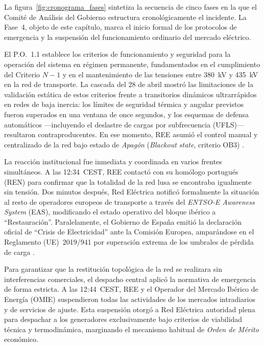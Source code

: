 La figura~\ref{fig:cronograma_fases} sintetiza la secuencia de cinco fases
en la que el Comité de Análisis del Gobierno estructura cronológicamente
el incidente. La Fase~4, objeto de este capítulo, marca el inicio formal
de los protocolos de emergencia y la suspensión del funcionamiento ordinario
del mercado eléctrico.

El P.O.~1.1 establece los criterios de funcionamiento y seguridad para la
operación del sistema en régimen permanente, fundamentados en el cumplimiento
del Criterio $N-1$ y en el mantenimiento de las tensiones entre 380~kV y
435~kV en la red de transporte. La cascada del 28 de abril mostró las
limitaciones de la validación estática de estos criterios frente a
transitorios dinámicos ultrarrápidos en redes de baja inercia: los límites
de seguridad térmica y angular previstos fueron superados en una ventana
de once segundos, y los esquemas de defensa automáticos ---incluyendo el
deslastre de cargas por subfrecuencia (UFLS)--- resultaron contraproducentes.
En ese momento, REE asumió el control manual y centralizado de la red bajo
estado de \textit{Apagón} (\textit{Blackout state}, criterio OB3)
\cite{icai2025}.

\clearpage

La reacción institucional fue inmediata y coordinada en varios frentes
simultáneos. A las 12:34~CEST, REE contactó con su homólogo portugués (REN)
para confirmar que la totalidad de la red lusa se encontraba igualmente sin
tensión. Dos minutos después, Red Eléctrica notificó formalmente la
situación al resto de operadores europeos de transporte a través del
\textit{ENTSO-E Awareness System} (EAS), modificando el estado operativo
del bloque ibérico a ``Restauración''. Paralelamente, el Gobierno de España
emitió la declaración oficial de ``Crisis de Electricidad'' ante la Comisión
Europea, amparándose en el Reglamento (UE)~2019/941 por superación extrema
de los umbrales de pérdida de carga \cite{gobierno2025}.

Para garantizar que la restitución topológica de la red se realizara sin
interferencias comerciales, el despacho central aplicó la normativa de
emergencia de forma estricta. A las 12:44~CEST, REE y el Operador del
Mercado Ibérico de Energía (OMIE) suspendieron todas las actividades de
los mercados intradiarios y de servicios de ajuste. Esta suspensión otorgó
a Red Eléctrica autoridad plena para despachar a los generadores
exclusivamente bajo criterios de viabilidad técnica y termodinámica,
marginando el mecanismo habitual de \textit{Orden de Mérito} económico.


